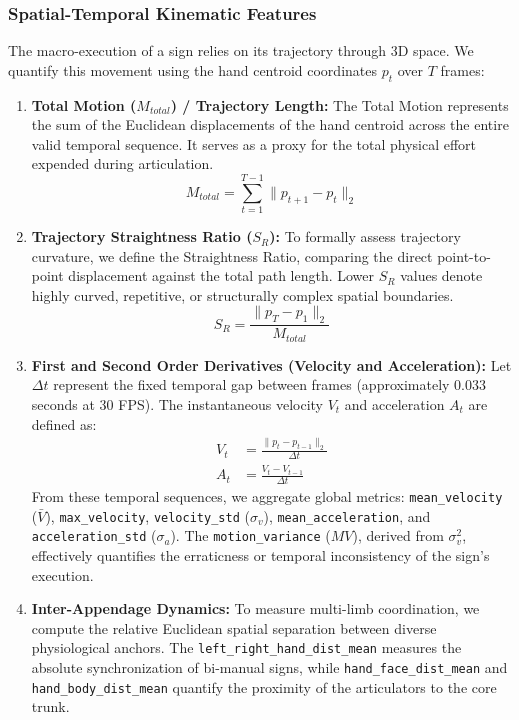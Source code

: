 \documentclass{ieeeaccess}
\DeclareRobustCommand{\textbf}[1]{{\bfseries #1}}
\begin{document}
\subsubsection{Spatial-Temporal Kinematic Features}
The macro-execution of a sign relies on its trajectory through 3D space. We quantify this movement using the hand centroid coordinates $p_t$ over $T$ frames:
\begin{enumerate}
    \item \textbf{Total Motion ($M_{total}$) / Trajectory Length:} The Total Motion represents the sum of the Euclidean displacements of the hand centroid across the entire valid temporal sequence. It serves as a proxy for the total physical effort expended during articulation. 
    \begin{equation} \label{eq:totalmotion} 
    M_{total} = \sum_{t=1}^{T-1} \lVert p_{t+1} - p_t \rVert_2 
    \end{equation}
    
    \item \textbf{Trajectory Straightness Ratio ($S_R$):} To formally assess trajectory curvature, we define the Straightness Ratio, comparing the direct point-to-point displacement against the total path length. Lower $S_R$ values denote highly curved, repetitive, or structurally complex spatial boundaries.
    \begin{equation} \label{eq:straightness}
    S_R = \frac{\lVert p_T - p_1 \rVert_2}{M_{total}}
    \end{equation}
    
    \item \textbf{First and Second Order Derivatives (Velocity and Acceleration):} Let $\Delta t$ represent the fixed temporal gap between frames (approximately $0.033$ seconds at 30 FPS). The instantaneous velocity $V_t$ and acceleration $A_t$ are defined as: 
    \begin{align} 
    V_t &= \frac{\lVert p_t - p_{t-1} \rVert_2}{\Delta t} \label{eq:velocity} \\ 
    A_t &= \frac{V_t - V_{t-1}}{\Delta t} \label{eq:acceleration} 
    \end{align} 
    From these temporal sequences, we aggregate global metrics: \texttt{mean\_velocity} ($\bar{V}$), \texttt{max\_velocity}, \texttt{velocity\_std} ($\sigma_v$), \texttt{mean\_acceleration}, and \texttt{acceleration\_std} ($\sigma_a$). The \texttt{motion\_variance} ($MV$), derived from $\sigma_v^2$, effectively quantifies the erraticness or temporal inconsistency of the sign's execution.
    
    \item \textbf{Inter-Appendage Dynamics:} To measure multi-limb coordination, we compute the relative Euclidean spatial separation between diverse physiological anchors. The \texttt{left\_right\_hand\_dist\_mean} measures the absolute synchronization of bi-manual signs, while \texttt{hand\_face\_dist\_mean} and \\ \texttt{hand\_body\_dist\_mean} quantify the proximity of the articulators to the core trunk.
\end{enumerate}
\end{document}
